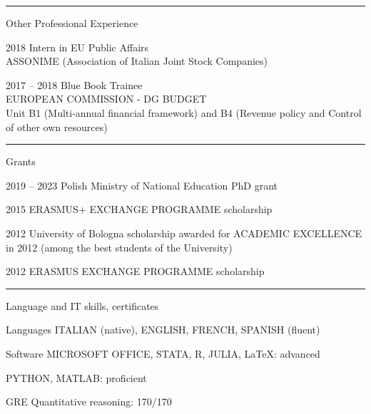 \documentclass[5pt,a4paper]{article}
\begin{document}
\begin{cv}{}
\hrule
  \begin{cvlist}{Other Professional Experience}
	\item[\small 2018] \normalsize Intern in EU Public Affairs\\
	\footnotesize ASSONIME (Association of Italian Joint Stock Companies)\small
	\item[\small 2017 -- 2018] \normalsize Blue Book Trainee\\
	\footnotesize EUROPEAN COMMISSION - DG BUDGET\\
	\small Unit B1 (Multi-annual financial framework) and B4 (Revenue policy and Control of other own resources)
	\end{cvlist}
	
	\hrule
  \begin{cvlist}{Grants}
  \item[\small 2019 -- 2023] \normalsize Polish Ministry of National Education PhD grant
	\item[\small 2015] \normalsize \footnotesize ERASMUS+ EXCHANGE PROGRAMME \normalsize scholarship
  \item[\small 2012] \normalsize University of Bologna scholarship awarded for \footnotesize ACADEMIC EXCELLENCE \normalsize in 2012 (among the best students of the University)
	\item[\small 2012] \normalsize \footnotesize ERASMUS EXCHANGE PROGRAMME \normalsize scholarship
  \end{cvlist}
	\hrule
  \begin{cvlist}{Language and IT skills, certificates}
  \item[Languages] \footnotesize ITALIAN (native), ENGLISH, FRENCH, SPANISH (fluent)
	\item[Software] \footnotesize MICROSOFT OFFICE, STATA, R, JULIA, \LaTeX: \normalsize advanced
	\item \footnotesize PYTHON, MATLAB: \normalsize proficient
	\item[GRE] Quantitative reasoning: 170/170
  \end{cvlist}

\end{cv}
\end{document}
